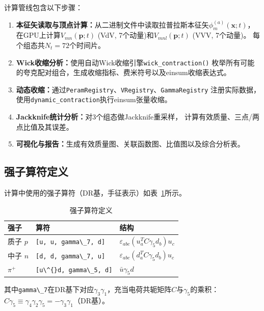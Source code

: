 \documentclass[11pt,a4paper]{article}
\begin{document}
计算管线包含以下步骤：

\begin{enumerate}[label=(\arabic*), leftmargin=*]
\item \textbf{本征矢读取与顶点计算：}从二进制文件中读取拉普拉斯本征矢$\phi_m^{(a)}(\bm{x};t)$，
在GPU上计算$V_{mn}(\bm{p};t)$ (VdV, 7个动量)和$V_{mnl}(\bm{p};t)$ (VVV, 7个动量)。
每个组态共$N_t=72$个时间片。

\item \textbf{Wick收缩分析：}使用自动Wick收缩引擎\verb|wick_contraction()|
枚举所有可能的夸克配对组合，生成收缩指标、费米符号以及einsum收缩表达式。

\item \textbf{动态收缩：}通过\verb|PeramRegistry|、\verb|VRegistry|、\verb|GammaRegistry|
注册实际数据，使用\verb|dynamic_contraction|执行einsum张量收缩。

\item \textbf{Jackknife统计分析：}对3个组态做Jackknife重采样，
计算有效质量、三点/两点比值及其误差。

\item \textbf{可视化与报告：}生成有效质量图、关联函数图、比值图以及综合分析表。
\end{enumerate}

\subsection{强子算符定义}

计算中使用的强子算符（DR基，手征表示）如表~\ref{tab:operators}所示。

\begin{table}[htbp]
\centering
\caption{强子算符定义}
\label{tab:operators}
\begin{tabular}{lll}
\toprule
强子 & 算符 & 结构 \\
\midrule
质子 $p$ & \verb|[u, u, gamma\_7, d]| & $\varepsilon_{abc}(u_a^T C\gamma_5 d_b)u_c$ \\
中子 $n$ & \verb|[d, d, gamma\_7, u]| & $\varepsilon_{abc}(d_a^T C\gamma_5 d_b)u_c$ \\
$\pi^+$ & \verb|[u\^{}d, gamma\_5, d]| & $\bar{u}\gamma_5 d$ \\
\bottomrule
\end{tabular}
\end{table}

其中\verb|gamma\_7|在DR基下对应$\gamma_3\gamma_1$，充当电荷共轭矩阵$C$与$\gamma_5$的乘积：
$C\gamma_5 \equiv \gamma_4\gamma_2\gamma_5 = -\gamma_3\gamma_1$（DR基）。
\end{document}
